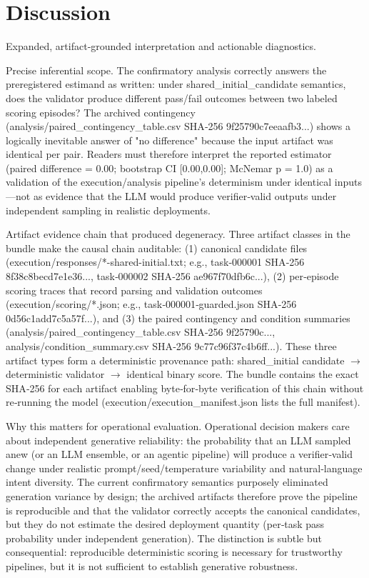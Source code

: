 \documentclass[conference]{IEEEtran}
\begin{document}
\section{Discussion}
Expanded, artifact‑grounded interpretation and actionable diagnostics.

Precise inferential scope. The confirmatory analysis correctly answers the preregistered estimand as written: under shared\_initial\_candidate semantics, does the validator produce different pass/fail outcomes between two labeled scoring episodes? The archived contingency (analysis/paired\_contingency\_table.csv SHA‑256 9f25790c7eeaafb3...) shows a logically inevitable answer of "no difference" because the input artifact was identical per pair. Readers must therefore interpret the reported estimator (paired difference = 0.00; bootstrap CI [0.00,0.00]; McNemar p = 1.0) as a validation of the execution/analysis pipeline's determinism under identical inputs---not as evidence that the LLM would produce verifier‑valid outputs under independent sampling in realistic deployments.

Artifact evidence chain that produced degeneracy. Three artifact classes in the bundle make the causal chain auditable: (1) canonical candidate files (execution/responses/*-shared-initial.txt; e.g., task‑000001 SHA‑256 8f38c8becd7e1e36..., task‑000002 SHA‑256 ae967f70dfb6c...), (2) per‑episode scoring traces that record parsing and validation outcomes (execution/scoring/*.json; e.g., task‑000001‑guarded.json SHA‑256 0d56c1add7c5a57f...), and (3) the paired contingency and condition summaries (analysis/paired\_contingency\_table.csv SHA‑256 9f25790c..., analysis/condition\_summary.csv SHA‑256 9c77c96f37c4b6ff...). These three artifact types form a deterministic provenance path: shared\_initial candidate \ensuremath{\rightarrow} deterministic validator \ensuremath{\rightarrow} identical binary score. The bundle contains the exact SHA‑256 for each artifact enabling byte‑for‑byte verification of this chain without re‑running the model (execution/execution\_manifest.json lists the full manifest).

Why this matters for operational evaluation. Operational decision makers care about independent generative reliability: the probability that an LLM sampled anew (or an LLM ensemble, or an agentic pipeline) will produce a verifier‑valid change under realistic prompt/seed/temperature variability and natural‑language intent diversity. The current confirmatory semantics purposely eliminated generation variance by design; the archived artifacts therefore prove the pipeline is reproducible and that the validator correctly accepts the canonical candidates, but they do not estimate the desired deployment quantity (per‑task pass probability under independent generation). The distinction is subtle but consequential: reproducible deterministic scoring is necessary for trustworthy pipelines, but it is not sufficient to establish generative robustness.
\end{document}
